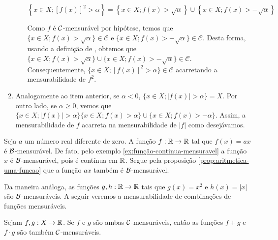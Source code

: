 \begin{prova}
\begin{enumerate}[label*=(\alph*)]
\begin{enumerate}[label = (\roman*)]
                $$\left\{x \in X; [f(x)]^2 > \alpha\right\} = \left\{x \in X; f(x)> \sqrt{\alpha}\right\}\cup \left\{x \in X; f(x)> -\sqrt{\alpha}\right\}$$
                
                Como $f$ é $\operatorname{\mathcal{C}}$-mensurável por hipótese, temos que $\{x \in X; f(x)> \sqrt{\alpha}\} \in \mathcal{C}$ e \linebreak $\{x \in X; f(x)> -\sqrt{\alpha}\} \in \mathcal{C}$.
                Desta forma, usando a definição de \sigal, obtemos que  $\{x \in X; f(x)> \sqrt{\alpha}\} \cup \{x \in X; f(x)> -\sqrt{\alpha}\} \in \mathcal{C}$. Consequentemente, 
                $\{x \in X; [f(x)]^2 > \alpha\} \in \mathcal{C}$ acarretando a mensurabilidade de $f^2$.
            \end{enumerate}
            
        \item Analogamente ao item anterior, se $\alpha < 0$, $\{x \in X; |f(x)| > \alpha\} = X$.
        Por outro lado, se $\alpha \geq 0$, vemos que 
        $\{x \in X; |f(x)| > \alpha\}\{x \in X; f(x)> \alpha\} \cup \{x \in X; f(x)> -\alpha\}$.
        Assim, a mensurabilidade de $f$ acarreta na mensurabilidade de $|f|$ como desejávamos.
    \end{enumerate}
\end{prova}

\begin{example}
\label{ex:funcao-afim-mensuravel}
    Seja $a$ um número real diferente de zero. 
    A função $f: \mathbb{R} \to \mathbb{R}$ tal que $f(x) = ax$ é $\operatorname{\mathcal{B}}$-mensurável.
    De fato, pelo exemplo \ref{ex:função-continua-mensuravel} a função $x$ é $\operatorname{\mathcal{B}}$-mensurável, pois é contínua em $\mathbb{R}$.
    Segue pela proposição \ref{prop:aritmetica-uma-funcao} que a função $ax$ também é $\operatorname{\mathcal{B}}$-mensurável.
\end{example}
   
    Da maneira análoga, as funções $g,h: \mathbb{R} \to \mathbb{R}$ tais que $g(x) = x^2$ e $h(x) = |x|$ são $\operatorname{\mathcal{B}}$-mensuráveis. 
    A seguir veremos a mensurabilidade de combinações de funções mensuráveis.


\begin{proposition}
\label{prop:aritmetica-duas-funcoes}
    Sejam $f,g:X \to \mathbb{R}$. Se $f$ e $g$ são ambas $\operatorname{\mathcal{C}}$-mensuráveis, então as funções $f+g$ e $f\cdot g$ são também $\operatorname{\mathcal{C}}$-mensuráveis.
\end{proposition}

